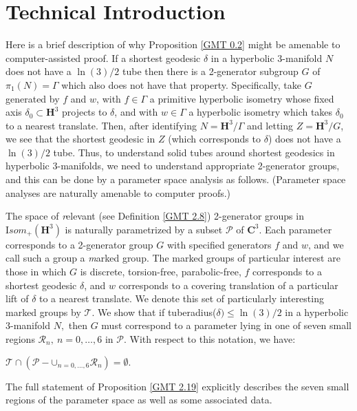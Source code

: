 \chapter{Technical Introduction}
Here is a brief description of why Proposition \ref{GMT 0.2} might be amenable to 
computer-assisted proof.
If a shortest geodesic $\delta$ in a hyperbolic $3$-manifold $N$ does not have 
a $\ln(3)/2$
tube then there is a 2-generator subgroup $G$ of $\pi_1(N) = \Gamma$
which also does not have that property.
Specifically, take $G$ generated by $f$ and $w$,
with $f \in \Gamma$ a primitive hyperbolic isometry
whose fixed axis $\delta_0 \subset {\mathbf H}^3$ projects to $\delta$, and 
with $w \in \Gamma$ a hyperbolic isometry
which takes $\delta_0$ to a nearest translate.
Then, after identifying $N={\mathbf H}^3/\Gamma$ and letting 
$Z={\mathbf H}^3/G$,
we see that the shortest geodesic in $Z$ (which corresponds to $\delta$)
does not have 
a $\ln(3)/2$ tube. 
Thus, to understand solid tubes around shortest geodesics in hyperbolic 
$3$-manifolds, we need to understand appropriate 2-generator groups, and this 
can be done by a parameter space analysis as follows.  (Parameter space 
analyses are naturally amenable to 
computer proofs.)

The space of {\textit relevant} (see Definition \ref{GMT 2.8}) 2-generator groups 
in ${\mathrm Isom}_+({\mathbf H}^3)$ is naturally
parametrized by a subset ${\mathcal P}$ of ${\mathbf C}^3.$  
Each parameter corresponds to a
2-generator group $G$ with specified generators $f$ and $w$, and we call 
such a group a {\textit marked group}. 
The marked groups of particular interest are those in which $G$ is
discrete, torsion-free, parabolic-free, $f$ corresponds to a shortest
geodesic $\delta$, and $w$ corresponds to a
covering translation of a particular lift of
$\delta$ to a nearest translate.  
We denote this set of particularly interesting marked groups by ${\mathcal T}.$
We show that if tuberadius($\delta) \le \ln(3)/2$ 
in a hyperbolic $3$-manifold $N,$ then 
$G$ must correspond to a parameter lying in one of seven small regions
${\mathcal R}_n,\ n=0,\ldots,6$ 
in ${\mathcal P}$.  
With respect to this notation, we have:

\begin{proposition} \label{GMT 2.19}
${\mathcal T} \cap ({\mathcal P} - \mathbf{\cup}_{n=0,\ldots,6}{\mathcal R}_n) = \emptyset.$
\vfill\end{proposition}

The full statement of Proposition \ref{GMT 2.19}
explicitly describes the seven small
regions of the parameter space as well as some associated data.

